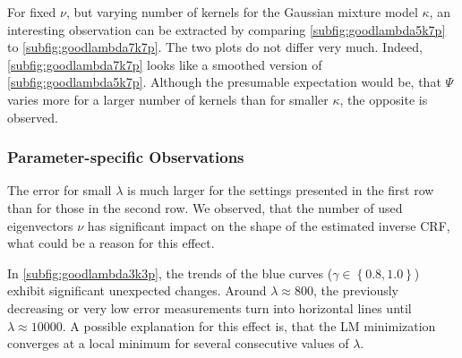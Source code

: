 For fixed $\nu$, but varying number of kernels for the Gaussian mixture model $\kappa$, an interesting observation can be extracted by comparing \autoref{subfig:goodlambda5k7p} to \autoref{subfig:goodlambda7k7p}. The two plots do not differ very much. Indeed, \autoref{subfig:goodlambda7k7p} looks like a smoothed version of \autoref{subfig:goodlambda5k7p}. Although the presumable expectation would be, that $\Psi$ varies more for a larger number of kernels than for smaller $\kappa$, the opposite is observed.



\subsubsection{Parameter-specific Observations}
\label{subsubsec:paramspecificobservations}

The error for small $\lambda$ is much larger for the settings presented in the first row than for those in the second row. We observed, that the number of used eigenvectors $\nu$ has significant impact on the shape of the estimated inverse CRF, what could be a reason for this effect.

In \autoref{subfig:goodlambda3k3p}, the trends of the blue curves ($\gamma \in \left\{0.8, 1.0\right\}$) exhibit significant unexpected changes. Around $\lambda \approx 800$, the previously decreasing or very low error measurements turn into horizontal lines until $\lambda \approx 10000$. A possible explanation for this effect is, that the LM minimization converges at a local minimum for several consecutive values of $\lambda$.


